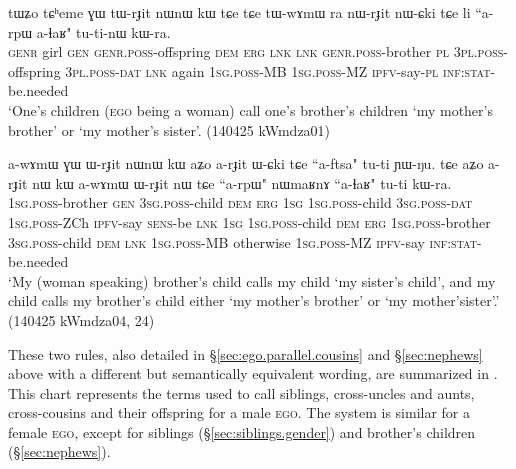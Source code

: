  \begin{exe}
\ex \label{ex:MBCh.2}
\gll tɯʑo tɕʰeme ɣɯ tɯ-rɟit nɯnɯ kɯ tɕe tɕe tɯ-wɤmɯ ra nɯ-rɟit nɯ-ɕki tɕe li ``a-rpɯ a-ɬaʁ"  tu-ti-nɯ kɯ-ra. \\
\textsc{genr} girl \textsc{gen} \textsc{genr}.\textsc{poss}-offspring \textsc{dem} \textsc{erg} \textsc{lnk} \textsc{lnk} \textsc{genr}.\textsc{poss}-brother \textsc{pl}  \textsc{3pl}.\textsc{poss}-offspring  \textsc{3pl}.\textsc{poss}-\textsc{dat} \textsc{lnk} again \textsc{1sg}.\textsc{poss}-MB \textsc{1sg}.\textsc{poss}-MZ \textsc{ipfv}-say-\textsc{pl} \textsc{inf}:\textsc{stat}-be.needed \\
\glt `One's children (\textsc{ego} being a woman) call one's brother's children  `my mother's brother' or  `my mother's sister'. (140425 kWmdza01)
\end{exe}

\begin{exe}
\ex \label{ex:FZCh.2}
\gll a-wɤmɯ ɣɯ ɯ-rɟit nɯnɯ kɯ aʑo a-rɟit ɯ-ɕki tɕe ``a-ftsa" tu-ti ɲɯ-ŋu.  tɕe aʑo a-rɟit nɯ kɯ a-wɤmɯ ɯ-rɟit nɯ tɕe ``a-rpɯ" nɯmaʁnɤ ``a-ɬaʁ" tu-ti kɯ-ra. \\
\textsc{1sg}.\textsc{poss}-brother \textsc{gen} \textsc{3sg}.\textsc{poss}-child \textsc{dem} \textsc{erg} \textsc{1sg} \textsc{1sg}.\textsc{poss}-child \textsc{3sg}.\textsc{poss}-\textsc{dat} \textsc{1sg}.\textsc{poss}-ZCh \textsc{ipfv}-say \textsc{sens}-be  \textsc{lnk} \textsc{1sg} \textsc{1sg}.\textsc{poss}-child \textsc{dem} \textsc{erg} \textsc{1sg}.\textsc{poss}-brother \textsc{3sg}.\textsc{poss}-child \textsc{dem} \textsc{lnk} \textsc{1sg}.\textsc{poss}-MB otherwise \textsc{1sg}.\textsc{poss}-MZ \textsc{ipfv}-say \textsc{inf}:\textsc{stat}-be.needed  \\
\glt `My (woman speaking) brother's child calls my child  `my sister's child', and my child  calls my brother's child either  `my mother's brother' or  `my mother'sister'.'  (140425 kWmdza04, 24)
\end{exe}

These two rules, also detailed in §\ref{sec:ego.parallel.cousins} and §\ref{sec:nephews} above with a different but semantically equivalent wording, are summarized in . This chart represents the terms used to call siblings, cross-uncles and aunts, cross-cousins and their offspring for a male \textsc{ego}. The system is similar for a female \textsc{ego}, except for  siblings (§\ref{sec:siblings.gender}) and brother's children (§\ref{sec:nephews}).

